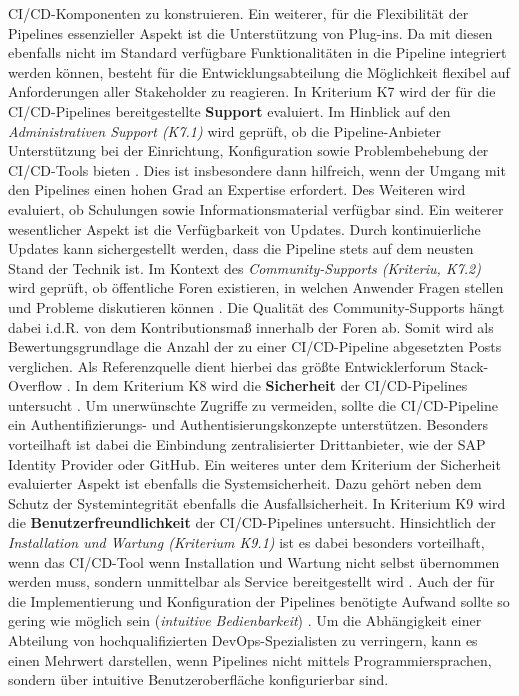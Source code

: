 CI/CD-Komponenten zu konstruieren. Ein weiterer, für die Flexibilität der Pipelines essenzieller Aspekt ist die Unterstützung von Plug-ins. Da mit diesen ebenfalls nicht im Standard verfügbare Funktionalitäten in die Pipeline integriert werden können, besteht für die Entwicklungsabteilung die Möglichkeit flexibel auf Anforderungen aller Stakeholder zu reagieren. In Kriterium K7 wird der für die CI/CD-Pipelines bereitgestellte \textbf{Support} evaluiert. Im Hinblick auf den \textit{Administrativen Support (K7.1)} wird geprüft, ob die Pipeline-Anbieter Unterstützung bei der Einrichtung, Konfiguration sowie Problembehebung der CI/CD-Tools bieten \cite[Z. 44 ff.]{ProductManagerSAPHyperspaceCICD.}. Dies ist insbesondere dann hilfreich, wenn der Umgang mit den Pipelines einen hohen Grad an Expertise erfordert. Des Weiteren wird evaluiert, ob Schulungen sowie Informationsmaterial verfügbar sind. Ein weiterer wesentlicher Aspekt ist die Verfügbarkeit von Updates. Durch kontinuierliche Updates kann sichergestellt werden, dass die Pipeline stets auf dem neusten Stand der Technik ist. Im Kontext des \textit{Community-Supports (Kriteriu, K7.2)} wird geprüft, ob öffentliche Foren existieren, in welchen Anwender Fragen stellen und Probleme diskutieren können \cite[Z. 45 ff.]{ProductManagerSAPHyperspaceCICD.}. Die Qualität des Community-Supports hängt dabei i.d.R. von dem Kontributionsmaß innerhalb der Foren ab. Somit wird als Bewertungsgrundlage die Anzahl der zu einer CI/CD-Pipeline abgesetzten Posts verglichen. Als Referenzquelle dient hierbei das größte Entwicklerforum Stack-Overflow \cite{StackOverflow.20230403}. In dem Kriterium K8 wird die \textbf{Sicherheit} der CI/CD-Pipelines untersucht \cite[Z. 75 ff.]{ProductOwnerSAPBTPProd&Infra.}. Um unerwünschte Zugriffe zu vermeiden, sollte die CI/CD-Pipeline ein Authentifizierungs- und Authentisierungskonzepte unterstützen. Besonders vorteilhaft ist dabei die Einbindung zentralisierter Drittanbieter, wie der SAP Identity Provider oder GitHub. Ein weiteres unter dem Kriterium der Sicherheit evaluierter Aspekt ist ebenfalls die Systemsicherheit. Dazu gehört neben dem Schutz der Systemintegrität ebenfalls die Ausfallsicherheit. In Kriterium K9 wird die \textbf{Benutzerfreundlichkeit} der CI/CD-Pipelines untersucht. Hinsichtlich der \textit{Installation und Wartung (Kriterium K9.1)} ist es dabei besonders vorteilhaft, wenn das CI/CD-Tool wenn Installation und Wartung nicht selbst übernommen werden muss, sondern unmittelbar als Service bereitgestellt wird \cite[Z. 65 ff.]{ProductOwnerSAPBTPProd&Infra.}. Auch der für die Implementierung und Konfiguration der Pipelines benötigte Aufwand sollte so gering wie möglich sein (\textit{intuitive Bedienbarkeit}) \cite[Z. 65 ff.]{ProductOwnerSAPBTPProd&Infra.}. Um die Abhängigkeit einer Abteilung von hochqualifizierten DevOps-Spezialisten zu verringern, kann es
einen Mehrwert darstellen, wenn Pipelines nicht mittels Programmiersprachen, sondern über intuitive Benutzeroberfläche konfigurierbar sind. 
